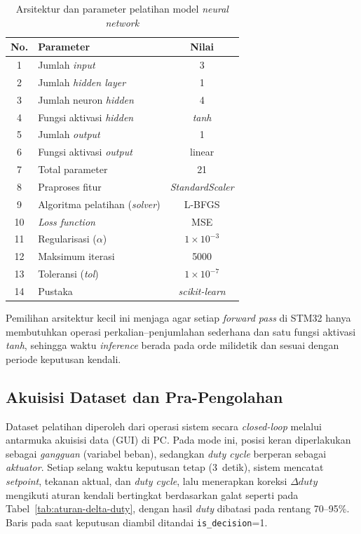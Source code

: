 \begin{table}[H]
  \centering
  \caption{Arsitektur dan parameter pelatihan model \emph{neural network}}
  \label{tab:parameter-pelatihan-nn-desain}
  \begin{tabular}{|c|p{5.5cm}|c|}
  \hline
  \textbf{No.} & \textbf{Parameter} & \textbf{Nilai} \\
  \hline
  1 & Jumlah \emph{input} & 3 \\
  \hline
  2 & Jumlah \emph{hidden layer} & 1 \\
  \hline
  3 & Jumlah neuron \emph{hidden} & 4 \\
  \hline
  4 & Fungsi aktivasi \emph{hidden} & \emph{tanh} \\
  \hline
  5 & Jumlah \emph{output} & 1 \\
  \hline
  6 & Fungsi aktivasi \emph{output} & linear \\
  \hline
  7 & Total parameter & 21 \\
  \hline
  8 & Praproses fitur & \emph{StandardScaler} \\
  \hline
  9 & Algoritma pelatihan (\emph{solver}) & L-BFGS \\
  \hline
  10 & \emph{Loss function} & MSE \\
  \hline
  11 & Regularisasi ($\alpha$) & $1\times10^{-3}$ \\
  \hline
  12 & Maksimum iterasi & 5000 \\
  \hline
  13 & Toleransi (\emph{tol}) & $1\times10^{-7}$ \\
  \hline
  14 & Pustaka & \emph{scikit-learn} \\
  \hline
  \end{tabular}
\end{table}

Pemilihan arsitektur kecil ini menjaga agar setiap \emph{forward pass}
di STM32 hanya membutuhkan operasi perkalian--penjumlahan sederhana dan
satu fungsi aktivasi \emph{tanh}, sehingga waktu \emph{inference} berada
pada orde milidetik dan sesuai dengan periode keputusan kendali.

\subsection{Akuisisi Dataset dan Pra-Pengolahan}
\label{sec:akuisisi-dataset-dan-pra-pengolahan}

Dataset pelatihan diperoleh dari operasi sistem secara
\emph{closed-loop} melalui antarmuka akuisisi data (GUI) di PC. Pada
mode ini, posisi keran diperlakukan sebagai \emph{gangguan} (variabel
beban), sedangkan \emph{duty cycle} berperan sebagai \emph{aktuator}.
Setiap selang waktu keputusan tetap (3~detik), sistem mencatat
\emph{setpoint}, tekanan aktual, dan \emph{duty cycle}, lalu menerapkan
koreksi $\Delta duty$ mengikuti aturan kendali bertingkat berdasarkan
galat seperti pada Tabel~\ref{tab:aturan-delta-duty}, dengan hasil
\emph{duty} dibatasi pada rentang 70--95\%. Baris pada saat keputusan
diambil ditandai \texttt{is\_decision}=1.

